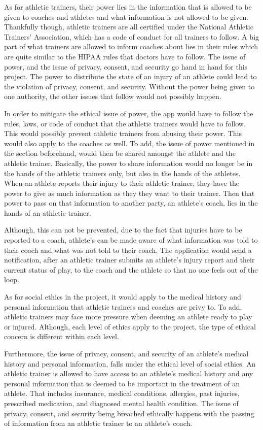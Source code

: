 \documentclass[10pt,twocolumn]{article}
\begin{document}
As for athletic trainers, their power lies in the information that is allowed to be given to coaches and athletes and what information is not allowed to be given. Thankfully though, athletic trainers are all certified under the National Athletic Trainers' Association, which has a code of conduct for all trainers to follow. A big part of what trainers are allowed to inform coaches about lies in their rules which are quite similar to the HIPAA rules that doctors have to follow. The issue of power, and the issue of privacy, consent, and security go hand in hand for this project. The power to distribute the state of an injury of an athlete could lead to the violation of privacy, consent, and security. Without the power being given to one authority, the other issues that follow would not possibly happen.

In order to mitigate the ethical issue of power, the app would have to follow the rules, laws, or code of conduct that the athletic trainers would have to follow. This would possibly prevent athletic trainers from abusing their power. This would also apply to the coaches as well. To add, the issue of power mentioned in the section beforehand, would then be shared amongst the athlete and the athletic trainer. Basically, the power to share information would no longer be in the hands of the athletic trainers only, but also in the hands of the athletes. When an athlete reports their injury to their athletic trainer, they have the power to give as much information as they they want to their trainer. Then that power to pass on that information to another party, an athlete's coach, lies in the hands of an athletic trainer. 

Although, this can not be prevented, due to the fact that injuries have to be reported to a coach, athlete's can be made aware of what information was told to their coach and what was not told to their coach. The application would send a notification, after an athletic trainer submits an athlete's injury report and their current status of play, to the coach and the athlete so that no one feels out of the loop.

As for social ethics in the project, it would apply to the medical history and personal information that athletic trainers and coaches are privy to. To add, athletic trainers may face more pressure when deeming an athlete ready to play or injured. Although, each level of ethics apply to the project, the type of ethical concern is different within each level.

Furthermore, the issue of privacy, consent, and security of an athlete's medical history and personal information, falls under the ethical level of social ethics. An athletic trainer is allowed to have access to an athlete's medical history and any personal information that is deemed to be important in the treatment of an athlete. That includes insurance, medical conditions, allergies, past injuries, prescribed medication, and diagnosed mental health condition. The issue of privacy, consent, and security being breached ethically happens with the passing of information from an athletic trainer to an athlete's coach. 
\end{document}
